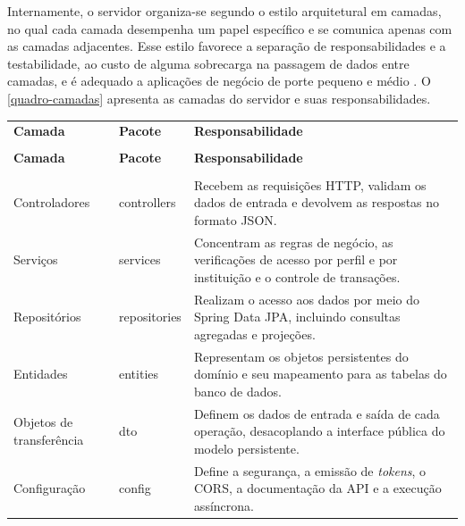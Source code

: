 Internamente, o servidor organiza-se segundo o estilo arquitetural em camadas, no qual cada camada desempenha um papel específico e se comunica apenas com as camadas adjacentes. Esse estilo favorece a separação de responsabilidades e a testabilidade, ao custo de alguma sobrecarga na passagem de dados entre camadas, e é adequado a aplicações de negócio de porte pequeno e médio \cite{richards2020}. O \autoref{quadro-camadas} apresenta as camadas do servidor e suas responsabilidades.

{\ABNTEXfontereduzida
\renewcommand{\arraystretch}{1.25}
\begin{xltabular}{\textwidth}{|>{\raggedright\arraybackslash}p{3.9cm}|>{\raggedright\arraybackslash}p{4.0cm}|>{\raggedright\arraybackslash}X|}
 \\[0.3em]
\hline
\textbf{Camada} & \textbf{Pacote} & \textbf{Responsabilidade} \\
\hline
\endfirsthead
{} \\
\hline
\textbf{Camada} & \textbf{Pacote} & \textbf{Responsabilidade} \\
\hline
\endhead
{} \\
\endfoot
\endlastfoot
Controladores & controllers & Recebem as requisições HTTP, validam os dados de entrada e devolvem as respostas no formato JSON. \\
\hline
Serviços & services & Concentram as regras de negócio, as verificações de acesso por perfil e por instituição e o controle de transações. \\
\hline
Repositórios & repositories & Realizam o acesso aos dados por meio do Spring Data JPA, incluindo consultas agregadas e projeções. \\
\hline
Entidades & entities & Representam os objetos persistentes do domínio e seu mapeamento para as tabelas do banco de dados. \\
\hline
Objetos de transferência & dto & Definem os dados de entrada e saída de cada operação, desacoplando a interface pública do modelo persistente. \\
\hline
Configuração & config & Define a segurança, a emissão de \textit{tokens}, o CORS, a documentação da API e a execução assíncrona. \\
\hline
\end{xltabular}
}

